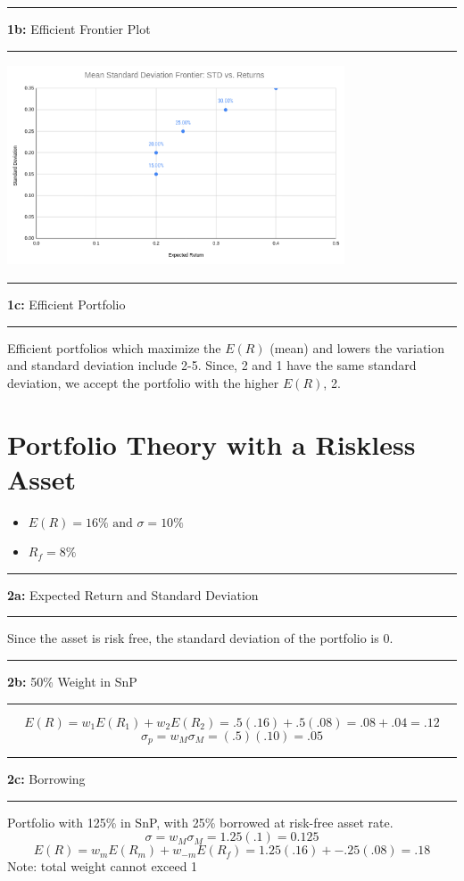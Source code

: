 \documentclass[11pt]{article}
\newcommand\question[2]{\vspace{.25in}\hrule\textbf{#1: } #2\vspace{.5em}\hrule\vspace{.10in}}
\begin{document}
\question{1b}{Efficient Frontier Plot}
\begin{center}
    \includegraphics[width=10cm, height=6cm]{MeanSTD_Frontier}
\end{center}

\question{1c}{Efficient Portfolio}
Efficient portfolios which maximize the $E(R)$ (mean) and lowers the variation and standard deviation include 2-5.
Since, 2 and 1 have the same standard deviation, we accept the portfolio with the higher $E(R)$, 2.


\section{Portfolio Theory with a Riskless Asset}
\begin{itemize}
    \item $E(R) = 16\% \text{ and } \sigma = 10\%$
    \item $R_f = 8\%$
\end{itemize}

\question{2a}{Expected Return and Standard Deviation} 
Since the asset is risk free, the standard deviation of the portfolio is 0.
\question{2b}{50\% Weight in SnP}
$$
    E(R) = w_1 E(R_1) + w_2 E(R_2) = .5(.16) + .5(.08) = .08 + .04 = .12
$$ 
$$
    \sigma_p = w_M \sigma_M = (.5)(.10) = .05
$$ 

\question{2c}{Borrowing}
Portfolio with 125\% in SnP, with 25\% borrowed at risk-free asset rate.
\[
    \sigma = w_M \sigma_M = 1.25(.1) = 0.125 
\]
\[
    E(R) = w_m E(R_m) + w_{-m}E(R_f) = 1.25(.16) + -.25(.08) = .18
\]
Note: total weight cannot exceed 1
\end{document}
